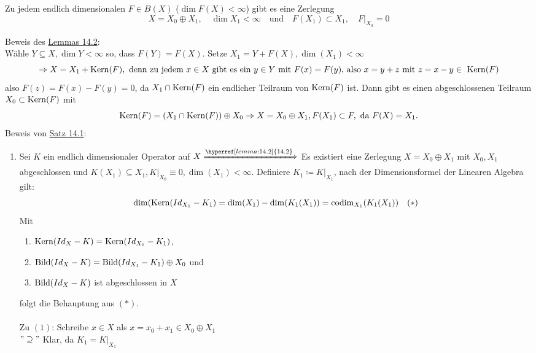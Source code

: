 \begin{lemma} \label{lemma:14.2}
	Zu jedem endlich dimensionalen $F \in B(X)$ ($\dim F(X) < \infty$) gibt es eine Zerlegung
		\[ X = X_{0} \oplus X_{1}, \quad \dim X_{1} < \infty \quad \text{und} \quad F(X_{1}) \subset X_{1}, \quad F|_{X_{0}} = 0 \]
\end{lemma}

\begin{beweis}
	Beweis des \hyperref[lemma:14.2]{Lemmas 14.2}: \\
	Wähle $Y \subseteq X, \dim Y < \infty$ so, dass $F(Y) = F(X)$. Setze $X_{1} = Y + F(X), \dim(X_{1}) < \infty$
		\[ \Rightarrow X = X_{1} + \kernn(F), \text{ denn zu jedem } x \in X \text{ gibt es ein } y \in Y \text{ mit } F(x) = F(y) \text{, also } x = y + z \text{ mit } z = x - y \in \kernn(F) \]
		also $F(z) = F(x) - F(y) = 0$, da $X_{1} \cap \mathop{\rm Kern}\nolimits(F)$ ein endlicher Teilraum von $\mathop{\rm Kern}\nolimits(F)$ ist. Dann gibt es einen abgeschlossenen Teilraum $X_{0} \subset \mathop{\rm Kern}\nolimits(F)$ mit 
		\[ \mathop{\rm Kern}\nolimits(F) = (X_{1} \cap \mathop{\rm Kern}\nolimits(F)) \oplus X_{0} \Rightarrow X = X_{0} \oplus X_{1}, F(X_{1}) \subset F, \text{ da } F(X) = X_{1}. \]
		Beweis von \hyperref[satz:14.1]{Satz 14.1}:
		\begin{enumerate}[label=\alph*\upshape)]
			\item Sei $K$ ein endlich dimensionaler Operator auf $X \xRightarrow[]{\hyperref[lemma:14.2]{14.2}}$ Es existiert eine Zerlegung $X = X_{0} \oplus X_{1}$ mit $X_{0}, X_{1}$ abgeschlossen und $K(X_{1}) \subseteq X_{1}, K|_{X_{0}} \equiv 0, \dim(X_{1}) < \infty$. Definiere $K_{1} \coloneqq K|_{X_{1}}$, nach der Dimensionsformel der Linearen Algebra gilt:
				\[ \dim( \mathop{\rm Kern}\nolimits(Id_{X_{1}} - K_{1}) = \dim(X_{1}) - \dim(K_{1}(X_{1})) = \operatorname{codim}_{X_{1}}(K_{1}(X_{1})) \quad (*) \label{eq:14.1.5-*} \]
				Mit
				\begin{enumerate}[label=(\arabic*\upshape)]
					\item $\mathop{\rm Kern}\nolimits(Id_{X} - K) = \mathop{\rm Kern}\nolimits(Id_{X_{1}} - K_{1})$,
					\item $\mathop{\rm Bild}\nolimits(Id_{X} - K) = \mathop{\rm Bild}\nolimits(Id_{X_{1}} - K_{1}) \oplus X_{0}$ und 
					\item $\mathop{\rm Bild}\nolimits(Id_{X} - K)$ ist abgeschlossen in $X$
				\end{enumerate}
				folgt die Behauptung aus \hyperref[eq:14.1.5-*]{$(*)$}. \\ \\
				Zu $(1)$: Schreibe $x \in X$ als $x = x_{0} + x_{1} \in X_{0} \oplus X_{1}$ \\
				$"\supseteq"$ Klar, da $K_{1} = K|_{X_{1}}$ \\

\end{enumerate}
\end{beweis}
